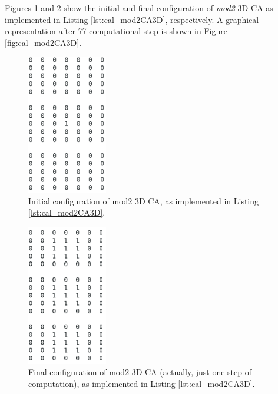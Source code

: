 Figures \ref{fig:mod2_0000} and \ref{fig:mod2_LAST} show the initial
and final configuration of \emph{mod2} 3D CA as implemented in Listing
\ref{lst:cal_mod2CA3D}, respectively. A graphical representation after
77 computational step is shown in Figure \ref{fig:cal_mod2CA3D}.

\begin{figure}
  \begin{center}
    \includegraphics[width=3.5cm]{./images/OpenCAL/mod2_0000}
    \caption{Initial configuration of mod2 3D CA, as implemented in Listing \ref{lst:cal_mod2CA3D}.}
    \label{fig:mod2_0000}
  \end{center}
\end{figure}

\begin{figure}
  \begin{center}
    \includegraphics[width=3.5cm]{./images/OpenCAL/mod2_LAST}
    \caption{Final configuration of mod2 3D CA (actually, just one step of computation), as implemented in Listing \ref{lst:cal_mod2CA3D}.}
    \label{fig:mod2_LAST}
  \end{center}
\end{figure}


